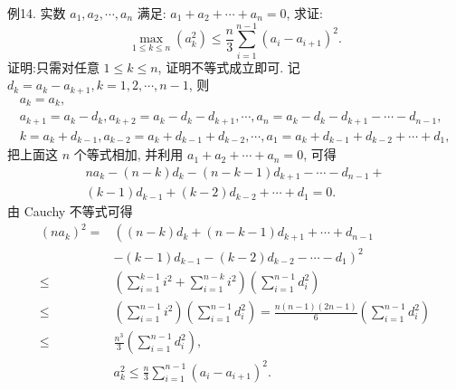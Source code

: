 例14. 实数 $a_1, a_2, \cdots, a_n$ 满足: $a_1+a_2+\cdots+a_n=0$, 求证:
$$
\max _{1 \leqslant k \leqslant n}\left(a_k^2\right) \leqslant \frac{n}{3} \sum_{i=1}^{n-1}\left(a_i-a_{i+1}\right)^2 .
$$
证明:只需对任意 $1 \leqslant k \leqslant n$, 证明不等式成立即可.
记 $d_k=a_k-a_{k+1}, k=1,2, \cdots, n-1$, 则
$$
\begin{gathered}
a_k=a_k, \\
a_{k+1}=a_k-d_k, a_{k+2}=a_k-d_k-d_{k+1}, \cdots, a_n=a_k-d_k-d_{k+1}-\cdots-d_{n-1}, \\
k=a_k+d_{k-1}, a_{k-2}=a_k+d_{k-1}+d_{k-2}, \cdots, a_1=a_k+d_{k-1}+d_{k-2}+\cdots+d_1,
\end{gathered}
$$
把上面这 $n$ 个等式相加, 并利用 $a_1+a_2+\cdots+a_n=0$, 可得
$$
\begin{gathered}
n a_k-(n-k) d_k-(n-k-1) d_{k+1}-\cdots-d_{n-1}+ \\
(k-1) d_{k-1}+(k-2) d_{k-2}+\cdots+d_1=0 .
\end{gathered}
$$
由 Cauchy 不等式可得
$$
\begin{aligned}
\left(n a_k\right)^2= & \left((n-k) d_k+(n-k-1) d_{k+1}+\cdots+d_{n-1}\right. \\
& \left.-(k-1) d_{k-1}-(k-2) d_{k-2}-\cdots-d_1\right)^2 \\
\leqslant & \left(\sum_{i=1}^{k-1} i^2+\sum_{i=1}^{n-k} i^2\right)\left(\sum_{i=1}^{n-1} d_i^2\right) \\
\leqslant & \left(\sum_{i=1}^{n-1} i^2\right)\left(\sum_{i=1}^{n-1} d_i^2\right)=\frac{n(n-1)(2 n-1)}{6}\left(\sum_{i=1}^{n-1} d_i^2\right) \\
\leqslant & \frac{n^3}{3}\left(\sum_{i=1}^{n-1} d_i^2\right), \\
& a_k^2 \leqslant \frac{n}{3} \sum_{i=1}^{n-1}\left(a_i-a_{i+1}\right)^2 .
\end{aligned}
$$



